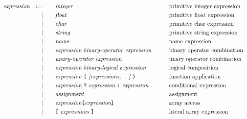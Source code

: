 \documentclass[a4paper]{article}
\begin{document}
\addtolength{\jot}{-0.5mm}
\begin{alignat*}{9}
	&& \textit{expression}   && ::= &\quad &&  \textit{integer}   && \textrm{primitive integer expression}\\
	&&                       && |   &\quad &&  \textit{float}   && \textrm{primitive float expression} \\
	&&                       && |   &\quad &&  \textit{char}   && \textrm{primitive char expression} \\
	&&                       && |   &\quad &&  \textit{string}   && \textrm{primitive string expression} \\
	&&                       && |   &\quad &&  \textit{name}   && \textrm{name expression} \\
	&&                       && |   &\quad &&  \textit{expression} \  \textit{binary-operator} \ 
												\textit{expression} \qquad
															   && \textrm{binary operator combination} \\
	&&                       && |   &\quad &&   \textit{unary-operator} \ 
												\textit{expression}
															   && \textrm{{unary operator combination}}\\
	&&                       && |   &\quad &&  \textit{expression} \  \textit{binary-logical} \ 
												\textit{expression} \qquad
															   && \textrm{{logical composition}}\\
	&&                       && |   &\quad &&   \textit{expression} \ 
												\textbf{\texttt{(}}\ \textit{[expressions, ...]}\
												\textbf{\texttt{)}}
															   && \textrm{{function application}} \\
	&&                       && |   &\quad &&   \textit{expression} \ \textbf{\texttt{?}}\ 
												\textit{expression}
												\ \textbf{\texttt{:}}\
												\textit{expression}\
															   && \textrm{{conditional expression}} \\
	&&                       && |   &\quad && \textit{assignment} 
															   && \textrm{assignment} \\
	&&                       && |   &\quad && \textit{expression} \textbf{\texttt{[}}
											  \textit{expression} \textbf{\texttt{]}}
															   && \textrm{array access} \\
	&&                       && |   &\quad &&   \textbf{\texttt{[}}\ 
												\textit{expressions}\
												\textbf{\texttt{]}}
															   && \textrm{literal array expression}\\

\end{alignat*}
\end{document}
